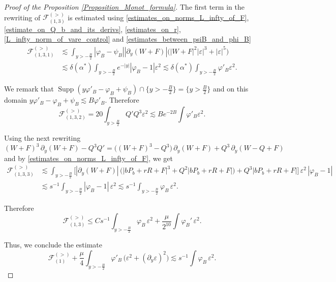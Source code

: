 \documentclass[16pt,english, oneside,reqno]{smfart}
\newcommand{\vare}{{\varepsilon}}
\newcommand{\vphi}{{\varphi}}
\DeclareMathOperator{\supp}{Supp}
\begin{document}
\begin{proof}[Proof of the Proposition \ref{Proposition_Monot_formula}]
The first term in the rewriting of $\mathcal{F}_{(1,3)}^{(>)}$ is estimated using \eqref{estimates_on_norms_L_infty_of_F}, \eqref{estimate_on_Q_b_and_its_derivs}, \eqref{estimates_on_r}, \eqref{L_infty_norm_of_vare_control} and \eqref{estimates_between_psiB_and_phi_B}
\begin{equation}
\begin{split}
    \mathcal{F}_{(1,3,1)}^{(>)} 
    & \lesssim \int_{y>-\frac B2} |\vphi_B-\psi_B||\partial_y(W+F)| \big( |W+F|^2 |\vare|^3 + |\vare|^5 \big)\\
    & \lesssim\delta(\alpha^*)\int_{y>-\frac B2} e^{-|y|}|\vphi_B-1|\vare^2 \lesssim \delta(\alpha^*)\int_{y>-\frac B2} \vphi'_B \vare^2.
\end{split}
\end{equation}

We remark that $\supp(y\vphi'_B -\vphi_B+\psi_B)\cap\{y>-\frac{B}{2}\} = \{y>\frac{B}{2} \}$ and on this domain $y\vphi'_B -\vphi_B +\psi_B \lesssim B\vphi'_B$. Therefore
\begin{equation}
    \mathcal{F}_{(1,3,2)}^{(>)} = 20\int_{y>\frac{B}{2}} Q'Q^3 \vare^2 \lesssim Be^{-2B}\int \vphi'_B \vare^2.
\end{equation}

Using the next rewriting
\begin{equation}
    (W+F)^3\,\partial_y (W+F)-Q^3 Q' = \big( (W+F)^3-Q^3 \big)\,\partial_y(W+F) + Q^3\,\partial_y(W-Q+F)
\end{equation}
and by \eqref{estimates_on_norms_L_infty_of_F}, we get
\begin{equation}
\begin{split}
    \mathcal{F}_{(1,3,3)}^{(>)} 
    & \lesssim \int_{y>-\frac B2} \Big[ |\partial_y (W+F)|\, \big(|bP_b+rR+F|^3 + Q^2|bP_b+ rR+F| \big) + Q^3 |bP_b + rR+F|\Big]\,\vare^2\,|\vphi_B-1|\\
    & \lesssim s^{-1}\int_{y>-\frac B2} |\vphi_B-1|\,\vare^2 \lesssim s^{-1}\int_{y>-\frac B2} \vphi_B \,\vare^2.
\end{split}
\end{equation}

Therefore
\begin{equation}
    \mathcal{F}_{(1,3)}^{(>)} \leq C s^{-1}\int_{y>-\frac B2} \vphi_B\,\vare^2 + \frac{\mu}{2^{10}}\int \vphi_B'\,\vare^2.
\end{equation}

Thus, we conclude the estimate 
\begin{equation}\label{mathcalF_estim_onF1_on_right}
    \mathcal{F}_{(1)}^{(>)} + \frac\mu 4 \int_{y>-\frac B2} \vphi'_B\, \big( \vare^2 + (\partial_y \vare)^2 \big) \lesssim s^{-1}\int \vphi_B\, \vare^2.
\end{equation}



\end{proof}
\end{document}
